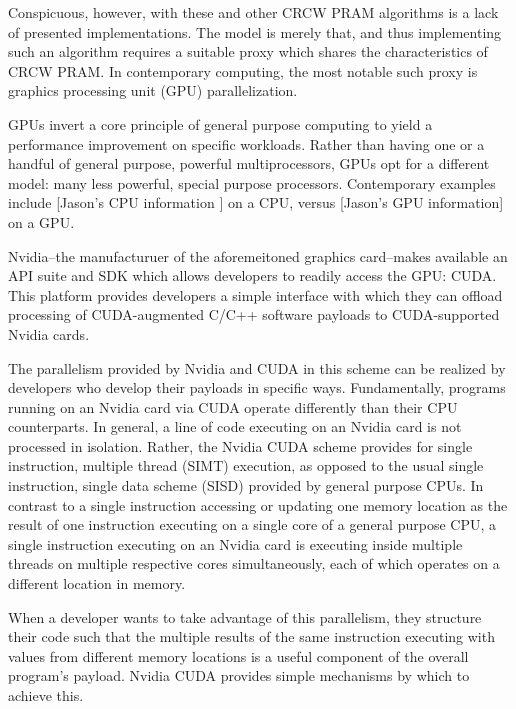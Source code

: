 \documentclass[letterpaper, 12pt]{article}
\begin{document}
  Conspicuous, however, with these and other CRCW PRAM algorithms is a lack of presented implementations.  The model is merely that, and thus implementing such an algorithm requires a suitable proxy which shares the characteristics of CRCW PRAM.  In contemporary computing, the most notable such proxy is graphics processing unit (GPU) parallelization.

  GPUs invert a core principle of general purpose computing to yield a performance improvement on specific workloads.  Rather than having one or a handful of general purpose, powerful multiprocessors, GPUs opt for a different model: many less powerful, special purpose processors.  Contemporary examples include [Jason's CPU information ] on a CPU, versus [Jason's GPU information] on a GPU.  

  Nvidia--the manufacturuer of the aforemeitoned graphics card--makes available an API suite and SDK which allows developers to readily access the GPU: CUDA.  This platform provides developers a simple interface with which they can offload processing of CUDA-augmented C/C++ software payloads to CUDA-supported Nvidia cards.

  The parallelism provided by Nvidia and CUDA in this scheme can be realized by developers who develop their payloads in specific ways.  Fundamentally, programs running on an Nvidia card via CUDA operate differently than their  CPU counterparts.  In general, a line of code executing on an Nvidia card is not processed in isolation.  Rather, the Nvidia CUDA scheme provides for single instruction, multiple thread (SIMT) execution, as opposed to the usual single instruction, single data scheme (SISD) provided by general purpose CPUs.  In contrast to a single instruction accessing or updating one memory location as the result of one instruction executing on a single core of a general purpose CPU, a single instruction executing on an Nvidia card is executing inside multiple threads on multiple respective cores simultaneously, each of which operates on a different location in memory.

  When a developer wants to take advantage of this parallelism, they structure their code such that the multiple results of the same instruction executing with values from different memory locations is a useful component of the overall program's payload.  Nvidia CUDA provides simple mechanisms by which to achieve this.
\end{document}
